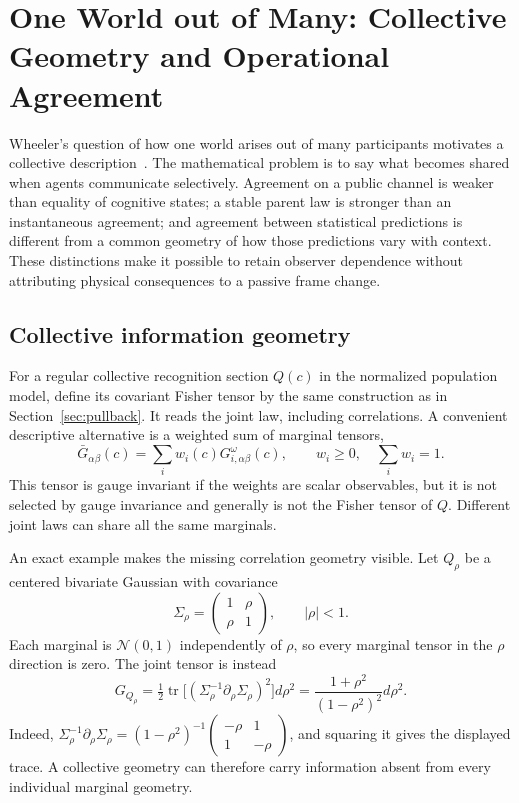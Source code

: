 \section{One World out of Many: Collective Geometry and Operational Agreement}\label{sec:collective_geometry}

Wheeler's question of how one world arises out of many participants motivates a collective description~\cite{Wheeler1990}. The mathematical problem is to say what becomes shared when agents communicate selectively. Agreement on a public channel is weaker than equality of cognitive states; a stable parent law is stronger than an instantaneous agreement; and agreement between statistical predictions is different from a common geometry of how those predictions vary with context. These distinctions make it possible to retain observer dependence without attributing physical consequences to a passive frame change.

\subsection{Collective information geometry}
\label{sec:consensus_metric}

For a regular collective recognition section $Q(c)$ in the normalized population model, define its covariant Fisher tensor by the same construction as in Section~\ref{sec:pullback}. It reads the joint law, including correlations. A convenient descriptive alternative is a weighted sum of marginal tensors,
\begin{equation}
\bar G_{\alpha\beta}(c)=\sum_iw_i(c)G_{i,\alpha\beta}^\omega(c),\qquad
w_i\geq0,\quad\sum_iw_i=1.
\label{eq:consensus_metric_covariant}
\end{equation}
This tensor is gauge invariant if the weights are scalar observables, but it is not selected by gauge invariance and generally is not the Fisher tensor of $Q$. Different joint laws can share all the same marginals.

An exact example makes the missing correlation geometry visible. Let $Q_\rho$ be a centered bivariate Gaussian with covariance
\begin{equation}
\Sigma_\rho=\begin{pmatrix}1&\rho\\\rho&1\end{pmatrix},\qquad |\rho|<1.
\end{equation}
Each marginal is $\mathcal N(0,1)$ independently of $\rho$, so every marginal tensor in the $\rho$ direction is zero. The joint tensor is instead
\begin{equation}
G_{Q_\rho}=\tfrac12\operatorname{tr}\bigl[(\Sigma_\rho^{-1}\partial_\rho\Sigma_\rho)^2\bigr]d\rho^2
=\frac{1+\rho^2}{(1-\rho^2)^2}d\rho^2.
\label{eq:collective_correlation_geometry}
\end{equation}
Indeed, $\Sigma_\rho^{-1}\partial_\rho\Sigma_\rho=(1-\rho^2)^{-1}\left(\begin{smallmatrix}-\rho&1\\1&-\rho\end{smallmatrix}\right)$, and squaring it gives the displayed trace. A collective geometry can therefore carry information absent from every individual marginal geometry.

